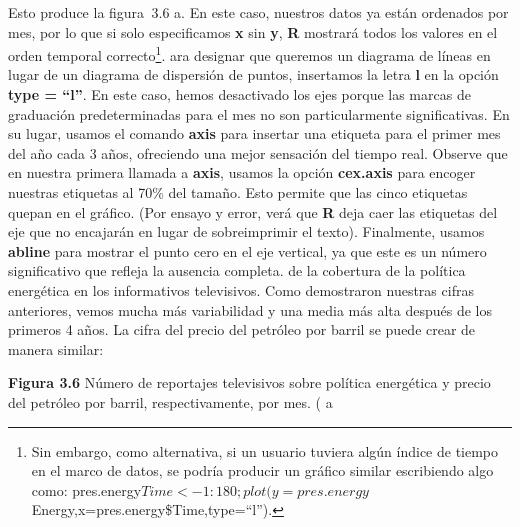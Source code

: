 \documentclass[
]{book}
\newenvironment{Shaded}{\begin{snugshade}}{\end{snugshade}}
\newcommand{\AttributeTok}[1]{\textcolor[rgb]{0.77,0.63,0.00}{#1}}
\newcommand{\DecValTok}[1]{\textcolor[rgb]{0.00,0.00,0.81}{#1}}
\newcommand{\FunctionTok}[1]{\textcolor[rgb]{0.00,0.00,0.00}{#1}}
\newcommand{\NormalTok}[1]{#1}
\newcommand{\SpecialCharTok}[1]{\textcolor[rgb]{0.00,0.00,0.00}{#1}}
\newcommand{\StringTok}[1]{\textcolor[rgb]{0.31,0.60,0.02}{#1}}
\begin{document}
Esto produce la figura  3.6 a. En este caso, nuestros datos ya están ordenados por mes, por lo que si solo especificamos \textbf{x} sin \textbf{y}, \textbf{R} mostrará todos los valores en el orden temporal correcto\footnote{Sin embargo, como alternativa, si un usuario tuviera algún índice de tiempo en el marco de datos, se podría producir un gráfico similar escribiendo algo como: pres.energy\(Time<-1:180; plot(y=pres.energy\)Energy,x=pres.energy\$Time,type=``l'').}. ara designar que queremos un diagrama de líneas en lugar de un diagrama de dispersión de puntos, insertamos la letra \textbf{l} en la opción \textbf{type = ``l''}. En este caso, hemos desactivado los ejes porque las marcas de graduación predeterminadas para el mes no son particularmente significativas. En su lugar, usamos el comando \textbf{axis} para insertar una etiqueta para el primer mes del año cada 3 años, ofreciendo una mejor sensación del tiempo real. Observe que en nuestra primera llamada a \textbf{axis}, usamos la opción \textbf{cex.axis} para encoger nuestras etiquetas al 70\% del tamaño. Esto permite que las cinco etiquetas quepan en el gráfico. (Por ensayo y error, verá que \textbf{R} deja caer las etiquetas del eje que no encajarán en lugar de sobreimprimir el texto). Finalmente, usamos \textbf{abline} para mostrar el punto cero en el eje vertical, ya que este es un número significativo que refleja la ausencia completa. de la cobertura de la política energética en los informativos televisivos. Como demostraron nuestras cifras anteriores, vemos mucha más variabilidad y una media más alta después de los primeros 4 años. La cifra del precio del petróleo por barril se puede crear de manera similar:

\textbf{Figura 3.6} Número de reportajes televisivos sobre política energética y precio del petróleo por barril, respectivamente, por mes. ( a

\begin{Shaded}
\end{Shaded}
\end{document}
